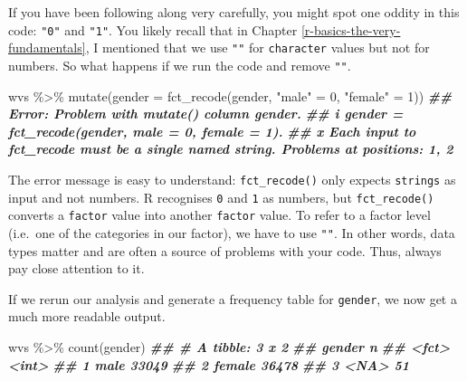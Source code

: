 \documentclass[
]{book}
\newenvironment{Shaded}{\begin{snugshade}}{\end{snugshade}}
\newcommand{\AttributeTok}[1]{\textcolor[rgb]{0.77,0.63,0.00}{#1}}
\newcommand{\DecValTok}[1]{\textcolor[rgb]{0.00,0.00,0.81}{#1}}
\newcommand{\DocumentationTok}[1]{\textcolor[rgb]{0.56,0.35,0.01}{\textbf{\textit{#1}}}}
\newcommand{\FunctionTok}[1]{\textcolor[rgb]{0.00,0.00,0.00}{#1}}
\newcommand{\NormalTok}[1]{#1}
\newcommand{\OtherTok}[1]{\textcolor[rgb]{0.56,0.35,0.01}{#1}}
\newcommand{\SpecialCharTok}[1]{\textcolor[rgb]{0.00,0.00,0.00}{#1}}
\newcommand{\StringTok}[1]{\textcolor[rgb]{0.31,0.60,0.02}{#1}}
\begin{document}
If you have been following along very carefully, you might spot one oddity in this code: \texttt{"0"} and \texttt{"1"}. You likely recall that in Chapter \ref{r-basics-the-very-fundamentals}, I mentioned that we use \texttt{""} for \texttt{character} values but not for numbers. So what happens if we run the code and remove \texttt{""}.

\begin{Shaded}
\begin{Highlighting}[]
\NormalTok{wvs }\SpecialCharTok{\%\textgreater{}\%} \FunctionTok{mutate}\NormalTok{(}\AttributeTok{gender =} \FunctionTok{fct\_recode}\NormalTok{(gender, }\StringTok{"male"} \OtherTok{=} \DecValTok{0}\NormalTok{, }\StringTok{"female"} \OtherTok{=} \DecValTok{1}\NormalTok{))}
\DocumentationTok{\#\# Error: Problem with \textasciigrave{}mutate()\textasciigrave{} column \textasciigrave{}gender\textasciigrave{}.}
\DocumentationTok{\#\# i \textasciigrave{}gender = fct\_recode(gender, male = 0, female = 1)\textasciigrave{}.}
\DocumentationTok{\#\# x Each input to fct\_recode must be a single named string. Problems at positions: 1, 2}
\end{Highlighting}
\end{Shaded}

The error message is easy to understand: \texttt{fct\_recode()} only expects \texttt{strings} as input and not numbers. R recognises \texttt{0} and \texttt{1} as numbers, but \texttt{fct\_recode()} converts a \texttt{factor} value into another \texttt{factor} value. To refer to a factor level (i.e.~one of the categories in our factor), we have to use \texttt{""}. In other words, data types matter and are often a source of problems with your code. Thus, always pay close attention to it.

If we rerun our analysis and generate a frequency table for \texttt{gender}, we now get a much more readable output.

\begin{Shaded}
\begin{Highlighting}[]
\NormalTok{wvs }\SpecialCharTok{\%\textgreater{}\%} \FunctionTok{count}\NormalTok{(gender)}
\DocumentationTok{\#\# \# A tibble: 3 x 2}
\DocumentationTok{\#\#   gender     n}
\DocumentationTok{\#\#   \textless{}fct\textgreater{}  \textless{}int\textgreater{}}
\DocumentationTok{\#\# 1 male   33049}
\DocumentationTok{\#\# 2 female 36478}
\DocumentationTok{\#\# 3 \textless{}NA\textgreater{}      51}
\end{Highlighting}
\end{Shaded}
\end{document}
